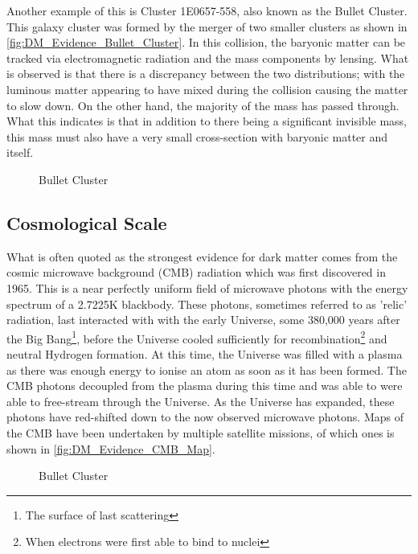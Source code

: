 \par
Another example of this is Cluster 1E0657-558, also known as the Bullet Cluster.
This galaxy cluster was formed by the merger of two smaller clusters as shown in \autoref{fig:DM_Evidence_Bullet_Cluster}.
In this collision, the baryonic matter can be tracked via electromagnetic radiation and the mass components by lensing.
What is observed is that there is a discrepancy between the two distributions; with the luminous matter appearing to have mixed during the collision causing the matter to slow down.
On the other hand, the majority of the mass has passed through.
What this indicates is that in addition to there being a significant invisible mass, this mass must also have a very small cross-section with baryonic matter and itself.
\begin{figure}[!htbp]%
    \centering
    \caption{Bullet Cluster}
    \label{fig:DM_Evidence_Bullet_Cluster}
\end{figure}


\subsection{Cosmological Scale}
\par
What is often quoted as the strongest evidence for dark matter comes from the cosmic microwave background (CMB) radiation which was first discovered in 1965.
This is a near perfectly uniform field of microwave photons with the energy spectrum of a 2.7225K blackbody.
These photons, sometimes referred to as 'relic' radiation, last interacted with with the early Universe, some 380,000 years after the Big Bang\footnote{The surface of last scattering}, before the Universe cooled sufficiently for recombination\footnote{When electrons were first able to bind to nuclei} and neutral Hydrogen formation.
At this time, the Universe was filled with a plasma as there was enough energy to ionise an atom as soon as it has been formed.
The CMB photons decoupled from the plasma during this time and was able to were able to free-stream through the Universe.
As the Universe has expanded, these photons have red-shifted down to the now observed microwave photons.
Maps of the CMB have been undertaken by multiple satellite missions, of which ones is shown in \autoref{fig:DM_Evidence_CMB_Map}.

\begin{figure}[!htbp]%
    \centering
    \caption{Bullet Cluster}
    \label{fig:DM_Evidence_CMB_Map}
\end{figure}

